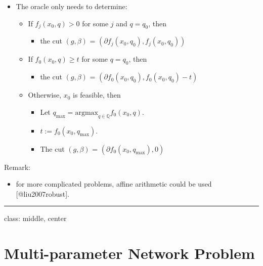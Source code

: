 \documentclass[
]{article}
\providecommand{\tightlist}{%
  \setlength{\itemsep}{0pt}\setlength{\parskip}{0pt}}
\begin{document}
\begin{itemize}
\tightlist
\item
  The oracle only needs to determine:

  \begin{itemize}
  \tightlist
  \item
    If \(f_j(x_0, q) > 0\) for some \(j\) and \(q = q_0\), then

    \begin{itemize}
    \tightlist
    \item
      the cut \((g, \beta)\) =
      \((\partial f_j(x_0, q_0), f_j(x_0, q_0))\)
    \end{itemize}
  \item
    If \(f_0(x_0, q) \geq t\) for some \(q = q_0\), then

    \begin{itemize}
    \tightlist
    \item
      the cut \((g, \beta)\) =
      \((\partial f_0(x_0, q_0), f_0(x_0, q_0) - t)\)
    \end{itemize}
  \item
    Otherwise, \(x_0\) is feasible, then

    \begin{itemize}
    \tightlist
    \item
      Let \(q_{\max} = \text{argmax}_{q \in \mathbb Q} f_0(x_0, q)\).
    \item
      \(t := f_0(x_0, q_{\max})\).
    \item
      The cut \((g, \beta)\) = \((\partial f_0(x_0, q_{\max}), 0)\)
    \end{itemize}
  \end{itemize}
\end{itemize}

Remark:

\begin{itemize}
\tightlist
\item
  for more complicated problems, affine arithmetic could be used
  {[}@liu2007robust{]}.
\end{itemize}

\begin{center}\rule{0.5\linewidth}{0.5pt}\end{center}

class: middle, center

\section{Multi-parameter Network
Problem}\label{multi-parameter-network-problem}
\end{document}
